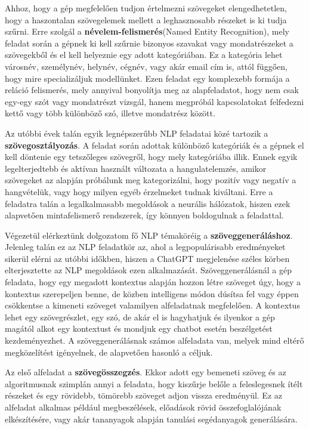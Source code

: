 Ahhoz, hogy a gép megfelelően tudjon értelmezni szövegeket elengedhetetlen, hogy a haszontalan szövegelemek mellett a leghasznosabb részeket is ki tudja szűrni. Erre szolgál a \textbf{névelem-felismerés}(Named Entity Recognition), mely feladat során a gépnek ki kell szűrnie bizonyos szavakat vagy mondatrészeket a szövegekből és el kell helyeznie egy adott kategóriában. Ez a kategória lehet városnév, személynév, helynév, cégnév, vagy akár email cím is, attól függően, hogy mire specializáljuk modellünket. Ezen feladat egy komplexebb formája a reláció felismerés, mely annyival bonyolítja meg az alapfeladatot, hogy nem csak egy-egy szót vagy mondatrészt vizsgál, hanem megpróbál kapcsolatokat felfedezni kettő vagy több különböző szó, illetve mondatrész között.

Az utóbbi évek talán egyik legnépszerűbb NLP feladatai közé tartozik a \textbf{szövegosztályozás}. A feladat során adottak különböző kategóriák és a gépnek el kell döntenie egy tetszőleges szövegről, hogy mely kategóriába illik. Ennek egyik legelterjedtebb és aktívan használt változata a hangulatelemzés, amikor szövegeket az alapján próbálunk meg kategorizálni, hogy pozitív vagy negatív a hangvételük, vagy hogy milyen egyéb érzelmeket tudnak kiváltani. Erre a feladatra talán a legalkalmasabb megoldások a neurális hálózatok, hiszen ezek alapvetően mintafelismerő rendszerek, így könnyen boldogulnak a feladattal.

	Végezetül elérkeztünk dolgozatom fő NLP témaköréig a \textbf{szöveggeneráláshoz}. Jelenleg talán ez az NLP feladatkör az, ahol a legpopulárisabb eredményeket sikerül elérni az utóbbi időkben, hiszen a ChatGPT megjelenése széles körben elterjesztette az NLP megoldások ezen alkalmazását. Szöveggenerálásnál a gép feladata, hogy egy megadott kontextus alapján hozzon létre szöveget úgy, hogy a kontextus szerepeljen benne, de közben intelligens módon dúsítsa fel vagy éppen csökkentse a kimeneti szöveget valamilyen alfeladatnak megfelelően. A kontextus lehet egy szövegrészlet, egy szó, de akár el is hagyhatjuk és ilyenkor a gép magától alkot egy kontextust és mondjuk egy chatbot esetén beszélgetést kezdeményezhet. A szöveggenerálásnak számos alfeladata van, melyek mind eltérő megközelítést igényelnek, de alapvetően hasonló a céljuk.
	
	Az első alfeladat a \textbf{szövegösszegzés}. Ekkor adott egy bemeneti szöveg és az algoritmusnak szimplán annyi a feladata, hogy kiszűrje belőle a feleslegesnek ítélt részeket és egy rövidebb, tömörebb szöveget adjon vissza eredményül. Ez az alfeladat alkalmas például megbeszélések, előadások rövid összefoglalójának elkészítésére, vagy akár tananyagok alapján tanulási segédanyagok generálására.
	
